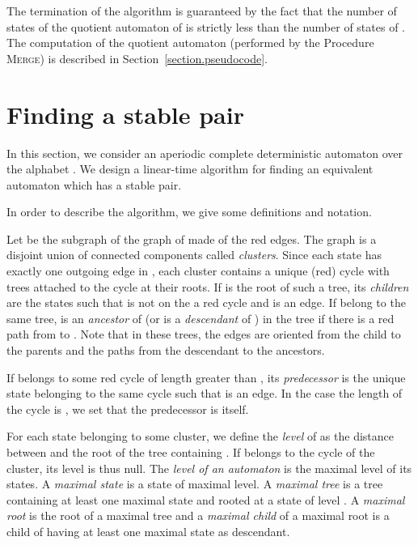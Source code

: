 \documentclass[11pt,a4paper]{article}
\begin{document}
The termination of the algorithm is guaranteed by the fact that the
number of states of the quotient automaton of  is strictly less
than the number of states of . The computation of the quotient
automaton (performed by the Procedure \textsc{Merge}) is described in
Section~\ref{section.pseudocode}.


\section{Finding a stable pair} \label{section.algo2}

In this section, we consider an aperiodic complete deterministic
automaton  over the alphabet . We design a linear-time
algorithm for finding an equivalent automaton which has a stable pair.

In order to describe the algorithm, we give some definitions and
notation.

Let  be the subgraph of the graph of  made of the red edges.
The graph  is a disjoint union of connected components called
\emph{clusters}. Since each state has exactly one outgoing edge in
, each cluster contains a unique (red) cycle with trees attached to the
cycle at their roots. If  is the root of such a tree, its
\emph{children} are the states  such that  is not on the a red
cycle and  is an edge. If  belong to the same tree,  is
an \emph{ancestor} of  (or  is a \emph{descendant} of ) in
the tree if there is a red path from  to . Note that in these trees,
the edges are oriented from the child to the parents and the paths from
the descendant to the ancestors.

If  belongs to some red cycle of length greater than , its
\emph{predecessor} is the unique state  belonging to the same cycle
such that  is an edge. In the case the length of the cycle
is , we set that the predecessor is  itself.

For each state  belonging to some cluster, we define the \emph{level} of 
as the distance between  and the root of the tree containing
. If  belongs to the cycle of the cluster, its level is thus null.
The \emph{level of an automaton} is the maximal level of its states.
A \emph{maximal state} is a state of maximal level.  
A \emph{maximal tree} is a tree containing at least one maximal state and rooted at
a state of level . 
 A \emph{maximal root} is the root of a maximal
tree and a \emph{maximal child} of a maximal root  is a child of  having at least one maximal state as descendant.
\end{document}
